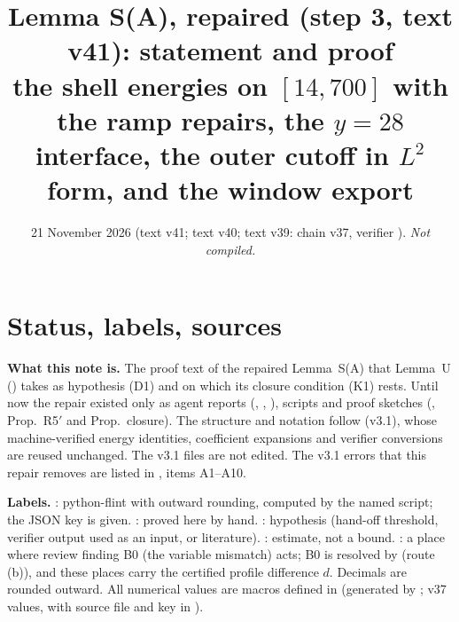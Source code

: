 \documentclass[11pt]{article}
\title{Lemma S(A), repaired (step 3, text v41): statement and proof\\[2pt]\large the shell energies on $[14,700]$ with the ramp repairs, the $y=28$ interface, the outer cutoff in $L^2$ form, and the window export}
\author{}\date{21 November 2026 (text v41; text v40; text v39: chain v37, verifier \fn{fin13v4c}). \emph{Not compiled.}}
\begin{document}
\maketitle
\tableofcontents
\fi

\section{Status, labels, sources}\label{A:sec:status}
\noindent\textbf{What this note is.} The proof text of the repaired Lemma~S(A) that Lemma~U () takes as hypothesis (D1) and on which its closure condition (K1) rests. Until now the repair existed only as agent reports (, , ), scripts and proof sketches (, Prop.~R5$'$ and Prop.~closure). The structure and notation follow  (v3.1), whose machine-verified energy identities, coefficient expansions and verifier conversions are reused unchanged. The v3.1 files are not edited. The v3.1 errors that this repair removes are listed in , items A1--A10.

\noindent\textbf{Labels.} \tC: python-flint  with outward rounding, computed by the named script; the JSON key is given. \tP: proved here by hand. \tH: hypothesis (hand-off threshold, verifier output used as an input, or literature). \tE: estimate, not a bound. \tB: a place where review finding B0 (the variable mismatch) acts; B0 is resolved by  (route (b)), and these places carry the certified profile difference $d$. Decimals are rounded outward. All numerical values are macros defined in  (generated by ; v37 values, with source file and key in ).
\end{document}
